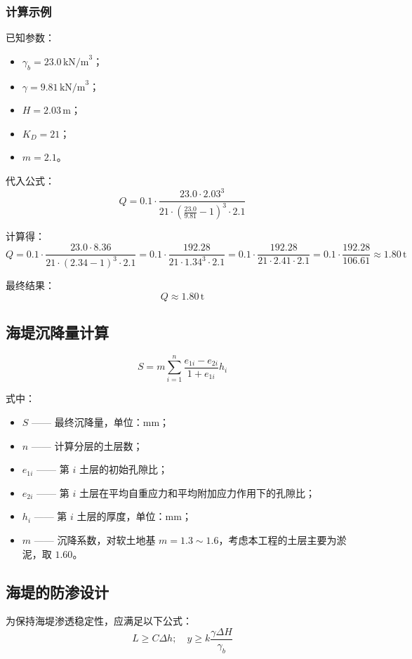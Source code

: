 \documentclass[UTF8, a4paper, 12pt]{ctexart} %
\begin{document}
\subsubsection{计算示例}

已知参数：
\begin{itemize}
    \item $\gamma_b = 23.0\,\text{kN/m}^3$；
    \item $\gamma = 9.81\,\text{kN/m}^3$；
    \item $H = 2.03\,\text{m}$；
    \item $K_D = 21$；
    \item $m = 2.1$。
\end{itemize}

代入公式：
\[
Q = 0.1 \cdot \frac{23.0 \cdot 2.03^3}{21 \cdot \left( \frac{23.0}{9.81} - 1 \right)^3 \cdot 2.1}
\]

计算得：
\[
Q = 0.1 \cdot \frac{23.0 \cdot 8.36}{21 \cdot \left( 2.34 - 1 \right)^3 \cdot 2.1} = 0.1 \cdot \frac{192.28}{21 \cdot 1.34^3 \cdot 2.1} = 0.1 \cdot \frac{192.28}{21 \cdot 2.41 \cdot 2.1} = 0.1 \cdot \frac{192.28}{106.61} \approx 1.80\,\text{t}
\]

最终结果：
\[
Q \approx 1.80\,\text{t}
\]
\subsection{海堤沉降量计算}


\begin{equation}
    S = m \sum_{i=1}^n \frac{e_{1i} - e_{2i}}{1 + e_{1i}} h_i
    \label{eq:settlement}
\end{equation}

式中：
\begin{itemize}
    \item $S$ —— 最终沉降量，单位：$\text{mm}$；
    \item $n$ —— 计算分层的土层数；
    \item $e_{1i}$ —— 第 $i$ 土层的初始孔隙比；
    \item $e_{2i}$ —— 第 $i$ 土层在平均自重应力和平均附加应力作用下的孔隙比；
    \item $h_i$ —— 第 $i$ 土层的厚度，单位：$\text{mm}$；
    \item $m$ —— 沉降系数，对软土地基 $m = 1.3 \sim 1.6$，考虑本工程的土层主要为淤泥，取 $1.60$。
\end{itemize}

\subsection{海堤的防渗设计}
为保持海堤渗透稳定性，应满足以下公式：
\begin{equation}
    L \geq C \Delta h; \quad y \geq k \frac{\gamma \Delta H}{\gamma_b}
\end{equation}
\end{document}

